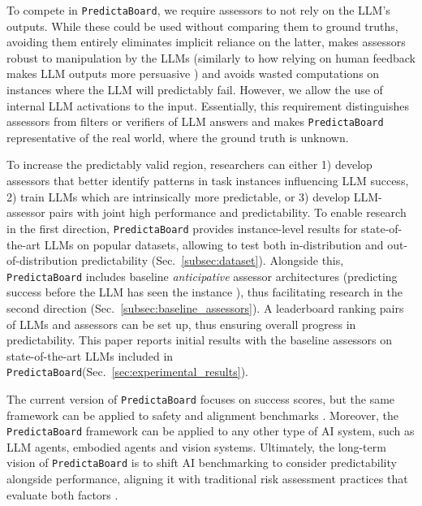 \documentclass[11pt]{article}
\newcommand{\predbench}{{\tt PredictaBoard}\xspace}
\begin{document}
To compete in \predbench, we require assessors to not rely on the LLM's outputs. While these could be used without comparing them to ground truths, avoiding them entirely eliminates implicit reliance on the latter, makes assessors robust to
manipulation by the LLMs (similarly to how relying on human feedback makes LLM outputs more persuasive \citealp{wen2024languagemodelslearnmislead,williams2024targeted})
 and avoids wasted computations on instances where the LLM will predictably fail. However, we allow the use of internal LLM activations to the input. Essentially, this requirement distinguishes assessors from filters or verifiers of LLM answers and makes \predbench representative of the real world, where the ground truth is unknown.



To increase the predictably valid region, researchers can either 1) develop assessors that better identify patterns in task instances influencing LLM success, 2) train LLMs which are intrinsically more predictable, or 3) develop LLM-assessor pairs with joint high performance and predictability. To enable research in the first direction, \predbench provides instance-level results for state-of-the-art LLMs on popular datasets, allowing to test both in-distribution and out-of-distribution predictability (Sec.~\ref{subsec:dataset}). Alongside this, \predbench includes baseline \textit{anticipative} assessor architectures (predicting success before the LLM has seen the instance \citealp{hernandez2022training}), thus facilitating research in the second direction (Sec.~\ref{subsec:baseline_assessors}). A leaderboard ranking pairs of LLMs and assessors can be set up, thus ensuring overall progress in predictability. This paper reports initial results with the baseline assessors on state-of-the-art LLMs included in \predbench (Sec.~\ref{sec:experimental_results}).

The current version of \predbench focuses on %
success scores, %
but the same framework can be applied to safety and alignment benchmarks \citep{zhang-etal-2024-safetybench, mazeika2024harmbench}.
Moreover, the \predbench framework can be applied to any other type of AI system, such as LLM agents, embodied agents and vision systems. %
Ultimately, the long-term vision of \predbench is to shift AI benchmarking to consider predictability alongside performance, aligning it with traditional risk assessment practices that evaluate both factors \cite{leveson2016engineering,aven2016risk,amodei2016concrete}.
\end{document}
